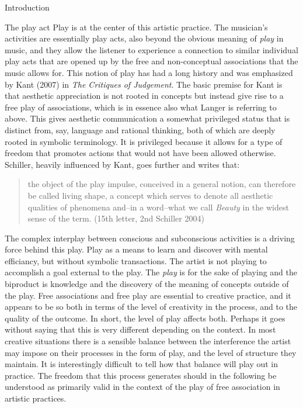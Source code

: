 \documentclass[presentation]{beamer}
\makeatletter
\newcommand{\cslcitation}[2]
 {\protect\hyper@linkstart{cite}{citeproc_bib_item_#1}#2\hyper@linkend}
\makeatother
\begin{document}
\begin{frame}[label={sec:org669441d}]{Introduction}
\begin{block}{The play act}
Play is at the center of this artistic practice. The musician's activities are essentially play acts, also beyond the obvious meaning of \emph{play} in music, and they allow the listener to experience a connection to similar individual play acts that are opened up by the free and non-conceptual associations that the music allows for. This notion of play has had a long history and was emphasized by Kant (\cslcitation{12}{2007}) in \emph{The Critiques of Judgement}. The basic premise for Kant is that aesthetic appreciation is not rooted in concepts but instead give rise to a free play of associations, which is in essence also what Langer is referring to above. This gives aesthetic communication a somewhat privileged status that is distinct from, say, language and rational thinking, both of which are deeply rooted in symbolic terminology. It is privileged because it allows for a type of freedom that promotes actions that would not have been allowed otherwise.
Schiller, heavily influenced by Kant, goes further and writes that:
\begin{quote}
the object of the play impulse, conceived in a general notion, can therefore be called living shape, a concept which serves to denote all aesthetic qualities of phenomena and--in a word--what we call \emph{Beauty} in the widest sense of the term. (15th letter, 2nd \cslcitation{17}{Schiller 2004})
\end{quote}

The complex interplay between conscious and subconscious activities is a driving force behind this play. Play as a means to learn and discover with mental efficiancy, but without symbolic transactions. The artist is not playing to accomplish a goal external to the play. The \emph{play} is for the sake of playing and the biproduct is knowledge and the discovery of the meaning of concepts outside of the play. Free associations and free play are essential to creative practice, and it appears to be so both in terms of the level of creativity in the process, and to the quality of the outcome. In short, the level of play affects both. Perhaps it goes without saying that this is very different depending on the context. In most creative situations there is a sensible balance between the interference the artist may impose on their processes in the form of play, and the level of structure they maintain. It is interestingly difficult to tell how that balance will play out in practice.
The freedom that this process generates should in the following be understood as primarily valid in the context of the play of free association in artistic practices.


\end{block}
\end{frame}
\end{document}
